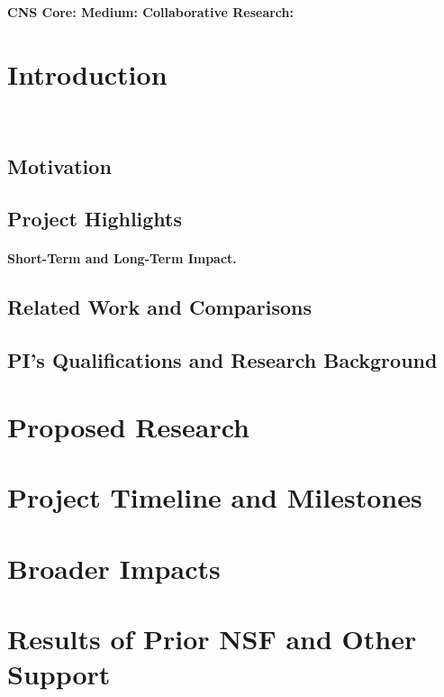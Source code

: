 \documentclass[11pt,table]{article}
\begin{document}
\begin{center}
\large{\bf CNS Core: Medium: Collaborative Research: }

\end{center}

\section{Introduction}

~\cite{automine}

\subsection{Motivation}


\subsection{Project Highlights}



\paragraph{Short-Term and Long-Term Impact.}

\subsection{Related Work and Comparisons}


\subsection{PI's Qualifications and Research Background}


\section{Proposed Research}


\section{Project Timeline and Milestones}



\section{Broader Impacts}


\section{Results of Prior NSF and Other Support}


\pagebreak


\end{document}
